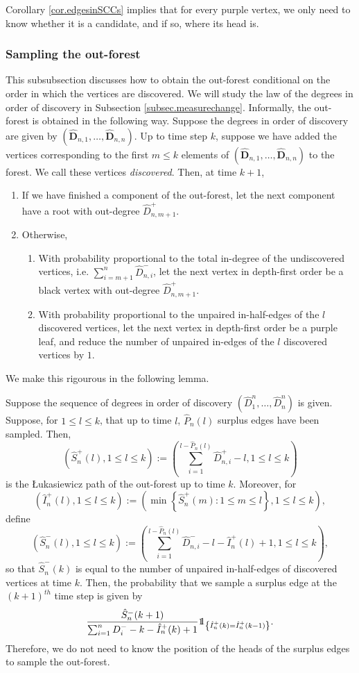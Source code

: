 Corollary \ref{cor.edgesinSCCs} implies that for every purple vertex, we only need to know whether it is a candidate, and if so, where its head is. 
\subsubsection{Sampling the out-forest}\label{subsubsec.samplingoutforest}
This subsubsection discusses how to obtain the out-forest conditional on the order in which the vertices are discovered. We will study the law of the degrees in order of discovery in Subsection \ref{subsec.measurechange}. Informally, the out-forest is obtained in the following way. Suppose the degrees in order of discovery are given by $(\mathbf{\hat{D}}_{n,1},\dots,\mathbf{\hat{D}}_{n,n})$. Up to time step $k$, suppose we have added the vertices corresponding to the first $m\leq k$ elements of  $(\mathbf{\hat{D}}_{n,1},\dots,\mathbf{\hat{D}}_{n,n})$ to the forest. We call these vertices \emph{discovered}. Then, at time $k+1$,
\begin{enumerate}
    \item If we have finished a component of the out-forest, let the next component have a root with out-degree $\hat{D}_{n,m+1}^+$. 
    \item Otherwise,
    \begin{enumerate}\item With probability proportional to the total in-degree of the undiscovered vertices, i.e. $\sum_{i={m+1}}^n \hat{D}_{n,i}^-$, let the next vertex in depth-first order be a black vertex with out-degree $\hat{D}_{n,m+1}^+$.
    \item With probability proportional to the unpaired in-half-edges of the $l$ discovered vertices, let the next vertex in depth-first order be a purple leaf, and reduce the number of unpaired in-edges of the $l$ discovered vertices by $1$.
\end{enumerate}
\end{enumerate}
We make this rigourous in the following lemma.
\begin{lemma}\label{lemma.sampleoutforest}
Suppose the sequence of degrees in order of discovery $(\hat{D}^n_1,\dots,\hat{D}^n_n)$ is given. Suppose, for $1\leq l\leq k$, that up to time $l$, $\hat{P}_n(l)$ surplus edges have been sampled. Then, $$\left(\hat{S}^+_n(l),1\leq l\leq k \right):=\left(\sum_{i=1}^{l-\hat{P}_n(l)}\hat{D}^+_{n,i}-l,1\leq l\leq k\right)$$ is the \L ukasiewicz path of the out-forest up to time $k$. Moreover, for $$\left(\hat{I}^+_n(l),1\leq l\leq k\right):=\left(\min\left\{\hat{S}^+_n(m):1\leq m \leq l\right\},1\leq l \leq k \right),$$
define 
$$\left(\hat{S}^-_n(l),1\leq l \leq k\right):=\left(\sum_{i=1}^{l-\hat{P}_n(l)}\hat{D}^-_{n,i}-l-\hat{I}^+_n(l)+1,1\leq l\leq k\right),$$
so that $\hat{S}^-_n(k)$ is equal to the number of unpaired in-half-edges of discovered vertices at time $k$. Then, the probability that we sample a surplus edge at the $(k+1)^{th}$ time step is given by
$$\frac{\hat{S}^-_n(k+1)}{\sum_{i=1}^n D^-_i-k-\hat{I}^+_n(k)+1}\one_{\left\{\hat{I}^+_n(k)=\hat{I}^+_n(k-1)\right\}}.$$
Therefore, we do not need to know the position of the heads of the surplus edges to sample the out-forest.
\end{lemma}
